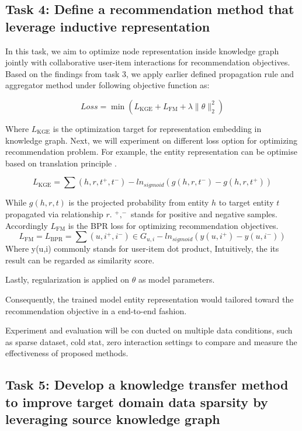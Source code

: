 \subsection*{Task 4: Define a recommendation method that leverage inductive representation}
In this task, we aim to optimize node representation inside knowledge graph jointly with collaborative user-item interactions for recommendation objectives.
Based on the findings from task 3, we apply earlier defined propagation rule and aggregator method under following objective function as:

\begin{equation}
    Loss=\min{(L_\text{KGE}+L_\text{FM}+\lambda\|\theta\|^2_2)}
\end{equation}

Where $L_\text{KGE}$ is the optimization target for representation embedding in knowledge graph. Next, we will experiment on different loss option for optimizing recommendation problem. For example, the entity representation can be optimise based on translation principle \citep{lin2017learning}.

\begin{equation}
    L_\text{KGE}=\sum{(h,r,t^+,t^-)} -ln_{sigmoid}(g(h,r,t^-)-g(h,r,t^+))
\end{equation}

While $g(h,r,t)$ is the projected probability from entity $h$ to target entity $t$ propagated via relationship $r$. $^+,^-$ stands for positive and negative samples. Accordingly $L_\text{FM}$ is the BPR \citep{rendle2012bpr} loss for optimizing recommendation objectives.
\begin{equation}
    L_\text{FM} = L_\text{BPR}=\sum{(u,i^+,i^-) \in G_{u,i}} -ln_{sigmoid}(y(u,i^+)-y(u,i^-))
\end{equation}
Where y(u,i) commonly stands for user-item dot product, Intuitively, the its result can be regarded as similarity score.

Lastly, regularization is applied on $\theta$ as model parameters.

Consequently, the trained model entity representation would tailored toward the recommendation objective in a end-to-end fashion.

Experiment and evaluation will be con ducted on multiple data conditions, such as sparse dataset, cold stat, zero interaction settings to compare and measure the effectiveness of proposed methods.


\subsection*{Task 5: Develop a knowledge transfer method to improve target domain data sparsity by leveraging source knowledge graph}

